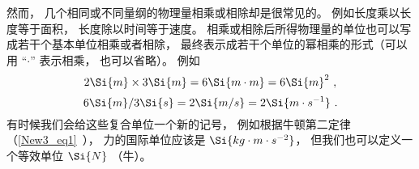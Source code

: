 然而， 几个相同或不同量纲的物理量相乘或相除却是很常见的。 例如长度乘以长度等于面积， 长度除以时间等于速度。 相乘或相除后所得物理量的单位也可以写成若干个基本单位相乘或者相除， 最终表示成若干个单位的幂相乘的形式（可以用 “$\cdot$” 表示相乘， 也可以省略）。 例如
\begin{equation}
2\Si{m} \times 3\Si{m} = 6\Si{m\cdot m} = 6\Si{m}^2~,
\end{equation}
\begin{equation}
6\Si{m} / 3\Si{s} = 2 \Si{m/s} = 2 \Si{m \cdot s^{-1}}~.
\end{equation}
有时候我们会给这些复合单位一个新的记号， 例如根据牛顿第二定律（\autoref{New3_eq1}~）， 力的国际单位应该是 $\Si{kg\cdot m\cdot s^{-2}}$， 但我们也可以定义一个等效单位 $\Si{N}$ （牛）。


